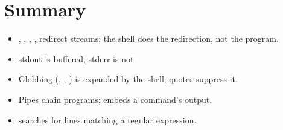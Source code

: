 \section*{Summary}
\begin{itemize}
  \item \code{>}, \code{>>}, \code{<}, ,  redirect streams;
        the shell does the redirection, not the program.
  \item stdout is buffered, stderr is not.
  \item Globbing (\code{*}, , \code{[...]}) is expanded by the shell;
        quotes suppress it.
  \item Pipes chain programs;  embeds a command's output.
  \item {} searches for lines matching a regular expression.
\end{itemize}
